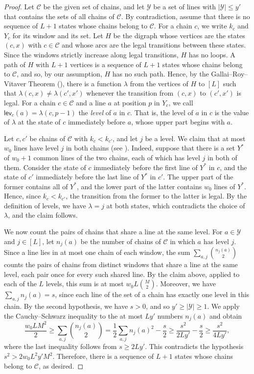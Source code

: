 \documentclass[fontsize=12pt,leading=14pt]{fullpaper}
\newcommand{\Ccal}{\mathcal{C}}
\newcommand{\Ycal}{\mathcal{Y}}
\begin{document}
\begin{proof}
  Let $\Ccal$ be the given set of chains, and let $\Ycal$ be a set of lines with $|\Ycal|\le y'$ that contains the sets of all chains of $\Ccal$.
  By contradiction, assume that there is no sequence of $L+1$ states whose chains belong to $\Ccal$.
  For a chain $c$, we write $k_c$ and $Y_c$ for its window and its set.
  Let $H$ be the digraph whose vertices are the states $(c,x)$ with $c\in\Ccal$ and whose arcs are the legal transitions between these states.
  Since the windows strictly increase along legal transitions, $H$ has no loops.
  A path of $H$ with $L+1$ vertices is a sequence of $L+1$ states whose chains belong to $\Ccal$, and so, by our assumption, $H$ has no such path.
  Hence, by the Gallai--Roy--Vitaver Theorem (), there is a function $\lambda$ from the vertices of $H$ to $[L]$ such that $\lambda(c,x)\ne\lambda(c',x')$ whenever the transition from $(c,x)$ to $(c',x')$ is legal.
  For a chain $c\in\Ccal$ and a line $a$ at position $p$ in $Y_c$, we call $\mathsf{lev}_c(a)=\lambda(c,p-1)$ the \emph{level} of $a$ in $c$.
  That is, the level of $a$ in $c$ is the value of $\lambda$ at the state of $c$ immediately before $a$, whose upper part begins with $a$.

  Let $c,c'$ be chains of $\Ccal$ with $k_c<k_{c'}$, and let $j$ be a level.
  We claim that at most $w_0$ lines have level $j$ in both chains (see ).
  Indeed, suppose that there is a set $Y^*$ of $w_0+1$ common lines of the two chains, each of which has level $j$ in both of them.
  Consider the state of $c$ immediately before the first line of $Y^*$ in $c$, and the state of $c'$ immediately before the last line of $Y^*$ in $c'$.
  The upper part of the former contains all of $Y^*$, and the lower part of the latter contains $w_0$ lines of $Y^*$.
  Hence, since $k_c<k_{c'}$, the transition from the former to the latter is legal.
  By the definition of levels, we have $\lambda=j$ at both states, which contradicts the choice of $\lambda$, and the claim follows.

  We now count the pairs of chains that share a line at the same level.
  For $a\in\Ycal$ and $j\in[L]$, let $n_j(a)$ be the number of chains of $\Ccal$ in which $a$ has level $j$.
  Since a line lies in at most one chain of each window, the sum $\sum_{a,j}\binom{n_j(a)}2$ counts the pairs of chains from distinct windows that share a line at the same level, each pair once for every such shared line.
  By the claim above, applied to each of the $L$ levels, this sum is at most $w_0L\binom M2$.
  Moreover, we have $\sum_{a,j}n_j(a)=s$, since each line of the set of a chain has exactly one level in this chain.
  By the second hypothesis, we have $s>0$, and so $y'\ge|\Ycal|\ge1$.
  We apply the Cauchy--Schwarz inequality to the at most $Ly'$ numbers $n_j(a)$ and obtain
  \[
    \frac{w_0LM^2}{2}
    \ge\sum_{a,j}\binom{n_j(a)}2
    =\frac12\sum_{a,j}n_j(a)^2-\frac s2
    \ge\frac{s^2}{2Ly'}-\frac s2
    \ge\frac{s^2}{4Ly'},
  \]
  where the last inequality follows from $s\ge2Ly'$.
  This contradicts the hypothesis $s^2>2w_0L^2y'M^2$.
  Therefore, there is a sequence of $L+1$ states whose chains belong to $\Ccal$, as desired.
\end{proof}
\end{document}

